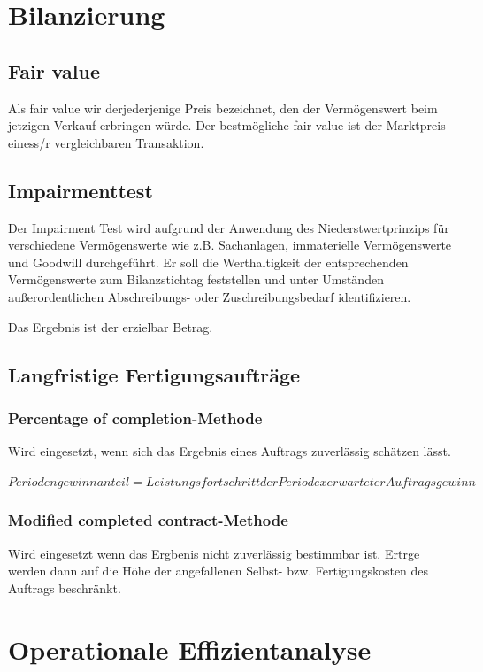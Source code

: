 \documentclass{article}
\begin{document}
\section{Bilanzierung}

\subsection{Fair value}

Als fair value wir derjederjenige Preis bezeichnet, den der Vermögenswert beim jetzigen Verkauf erbringen würde.
Der bestmögliche fair value ist der Marktpreis einess/r vergleichbaren Transaktion.

\subsection{Impairmenttest}
Der Impairment Test wird aufgrund der Anwendung des Niederstwertprinzips
für verschiedene Vermögenswerte wie z.B. Sachanlagen, immaterielle
Vermögenswerte und Goodwill durchgeführt.
Er soll die Werthaltigkeit der entsprechenden Vermögenswerte zum
Bilanzstichtag feststellen und unter Umständen außerordentlichen
Abschreibungs- oder Zuschreibungsbedarf identifizieren.

Das Ergebnis ist der erzielbar Betrag.
\subsection{Langfristige Fertigungsaufträge}

\subsubsection{Percentage of completion-Methode}
Wird eingesetzt, wenn sich das Ergebnis eines Auftrags zuverlässig schätzen lässt.
\begin{center}
$ Periodengewinnanteil =  Leistungsfortschritt der Periode x erwarteter Auftragsgewinn $
\end{center}
\subsubsection{Modified completed contract-Methode}

Wird eingesetzt wenn das Ergbenis nicht zuverlässig bestimmbar ist. Ertrge werden dann auf die Höhe der angefallenen Selbst- bzw. Fertigungskosten des Auftrags beschränkt.


\section{Operationale Effizientanalyse}
\end{document}
